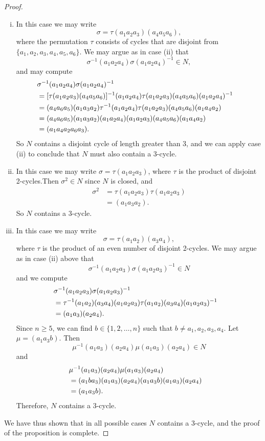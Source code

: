 \begin{proof}
\begin{enumerate}[(i)]
\item  
In this case we may write
\[
\sigma = \tau(a_1 a_2 a_3)(a_4 a_5 a_6),
\]
where the permutation $\tau$ consists of cycles that are disjoint from $\{a_1,a_2,a_3,a_4,a_5,a_6\}$.
We may argue as in case (ii) that
\[
\sigma^{-1}(a_1 a_2 a_4)\sigma(a_1 a_2 a_4)^{-1} \in N,
\]
and may compute
\begin{align*}
\lefteqn{\sigma^{-1}(a_1 a_2 a_4)\sigma(a_1 a_2 a_4)^{-1} } \\
& = [ \tau (a_1 a_2 a_3) (a_4 a_5 a_6) ]^{-1}  (a_1 a_2 a_4) 
      \tau (a_1 a_2 a_3) (a_4 a_5 a_6) (a_1 a_2 a_4)^{-1} \\
& = (a_4 a_6 a_5) (a_1 a_3 a_2) \tau^{-1}(a_1 a_2 a_4)  
      \tau (a_1 a_2 a_3) (a_4 a_5 a_6) (a_1 a_4 a_2) \\
& = (a_4 a_6 a_5)(a_1 a_3 a_2) (a_1 a_2 a_4)
      (a_1 a_2 a_3) (a_4 a_5 a_6)(a_1 a_4 a_2) \\
& = (a_1 a_4 a_2 a_6 a_3).
\end{align*}
So $N$ contains a disjoint cycle of length greater than 3, and we can
apply case (ii) to conclude that $N$ must also contain a 3-cycle. 
 
\item
In this case we may write $\sigma = \tau(a_1
a_2 a_3)$, where $\tau$ is the product of disjoint 2-cycles.Then $\sigma^2 \in N$ since $N$ is closed, and
\begin{align*}
\sigma^2
& = \tau(a_1 a_2 a_3)\tau(a_1 a_2 a_3) \\
& =(a_1 a_3 a_2).
\end{align*}
So $N$ contains a 3-cycle.
 
\item 
In this case we may write
\[
\sigma = \tau (a_1 a_2) (a_3 a_4),
\]
where $\tau$ is the product of an even number of disjoint 2-cycles.
We may argue as in case (ii) above that
\[
\sigma^{-1}(a_1 a_2 a_3)\sigma(a_1 a_2 a_3)^{-1} \in N
\]
and we compute
\begin{align*}
\lefteqn{\sigma^{-1}(a_1 a_2 a_3)\sigma(a_1 a_2 a_3)^{-1} } \\
& = \tau^{-1} (a_1 a_2) (a_3 a_4) (a_1 a_2 a_3) 
      \tau (a_1 a_2)(a_3 a_4)(a_1 a_2 a_3)^{-1} \\
& = (a_1 a_3)(a_2 a_4).
\end{align*}
Since $n \geq 5$, we can find $b \in \{1, 2, \ldots, n \}$ such that
$b \neq a_1, a_2, a_3, a_4$. Let $\mu = (a_1 a_3 b)$. Then
\[
\mu^{-1} (a_1 a_3)(a_2 a_4) \mu (a_1 a_3)(a_2 a_4) \in N
\]
and
\begin{align*}
\lefteqn{\mu^{-1} (a_1 a_3)(a_2 a_4) \mu (a_1 a_3)(a_2 a_4) } \\
& = (a_1 b a_3)(a_1 a_3)(a_2 a_4) 
      (a_1 a_3 b)(a_1 a_3)(a_2 a_4) \\
& = (a_1 a_3 b ).
\end{align*}
Therefore, $N$ contains a 3-cycle. 
\end{enumerate}
We have thus shown that in all possible cases $N$ contains a 3-cycle, and the  proof of the
proposition is complete.  
\end{proof}
 
